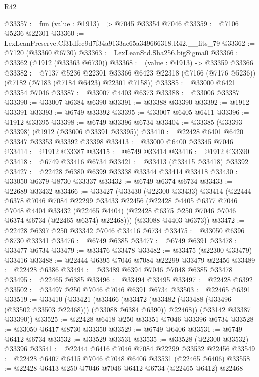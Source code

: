 \begin{lexlean}{R42}
\begin{coremodule}
{@33357 := fun (value : @1913) => @7045 @33354 @7046
@33359 := @7106 @5236 @22301
@33360 := LexLeanPreserve.Cf31dfec9d7f34a9133ae65a349666318.R42.__fits_79
@33362 := @7120 (@33360 @6730)
@33363 := LexLeanStd.Sha256.bigSigma0
@33366 := @33362 (@1912 (@33363 @6730))
@33368 := (value : @1913) -> @33359 @33366
@33382 := @7137
    @5236
    @22301
    @33366
    @6423
    @22318
    (@7166 (@7176 @5236))
    (@7182 (@7183 (@7184 @6423) @22301 @7158))
@33385 := @33000 @6421 @33354 @7046
@33387 := @33007 @4403 @6373
@33388 := @33006 @33387
@33390 := @33007 @6384 @6390
@33391 := @33388 @33390
@33392 := @1912 @33391
@33393 := @6749 @33392
@33395 := @33007 @6405 @6411
@33396 := @1912 @33395
@33398 := @6749 @33396 @6734
@33404 := @33385 (@33393 @33398) (@1912 (@33006 @33391 @33395))
@33410 := @22428 @6401 @6420 @33347 @33353 @33392 @33398
@33413 := @33000 @6400 @33345 @7046
@33414 := @1912 @33387
@33415 := @6749 @33414
@33416 := @1912 @33390
@33418 := @6749 @33416 @6734
@33421 := @33413 (@33415 @33418) @33392
@33427 := @22428 @6380 @6399 @33338 @33344 @33414 @33418
@33430 := @33050 @6379 @8730 @33337
@33432 := @6749 @6374 @6734
@33433 := @22689 @33432
@33466 := @33427
    (@33430
      (@22300 @33433)
      @33414
      (@22444
        @6378
        @7046
        @7084
        @22299
        @33433
        @22456
        (@22428
          @4405
          @6377
          @7046
          @7048
          @4404
          @33432
          (@22465 @4404)
          (@22428 @6375 @250 @7046 @7046 @6374 @6734 (@22465 @6374) @22468)))
      (@33088 @4403 @6373))
@33472 := @22428 @6397 @250 @33342 @7046 @33416 @6734
@33475 := @33050 @6396 @8730 @33341
@33476 := @6749 @6385
@33477 := @6749 @6391
@33478 := @33477 @6734
@33479 := @33476 @33478
@33482 := @33475 (@22300 @33479) @33416
@33488 := @22444 @6395 @7046 @7084 @22299 @33479 @22456
@33489 := @22428 @6386
@33494 := @33489 @6394 @7046 @7048 @6385 @33478
@33495 := @22465 @6385
@33496 := @33494 @33495
@33497 := @22428 @6392
@33502 := @33497 @250 @7046 @7046 @6391 @6734
@33503 := @22465 @6391
@33519 := @33410
    (@33421
      (@33466
        (@33472 (@33482 (@33488 (@33496 (@33502 @33503 @22468))) (@33088 @6384 @6390)) @22468))
      (@33142 @33387 @33390))
@33525 := @22428 @6418 @250 @33351 @7046 @33396 @6734
@33528 := @33050 @6417 @8730 @33350
@33529 := @6749 @6406
@33531 := @6749 @6412 @6734
@33532 := @33529 @33531
@33535 := @33528 (@22300 @33532) @33396
@33541 := @22444 @6416 @7046 @7084 @22299 @33532 @22456
@33549 := @22428 @6407 @6415 @7046 @7048 @6406 @33531 (@22465 @6406)
@33558 := @22428 @6413 @250 @7046 @7046 @6412 @6734 (@22465 @6412) @22468
}
\end{coremodule}
\end{lexlean}
